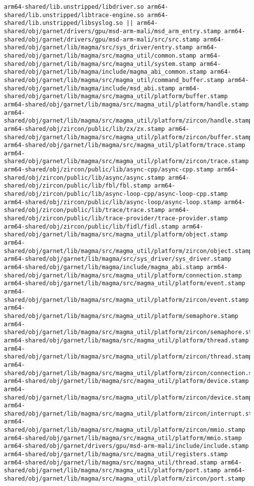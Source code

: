 \begin{verbatim}
arm64-shared/lib.unstripped/libdriver.so arm64-shared/lib.unstripped/libtrace-engine.so arm64-shared/lib.unstripped/libsyslog.so || arm64-shared/obj/garnet/drivers/gpu/msd-arm-mali/msd_arm_entry.stamp arm64-shared/obj/garnet/drivers/gpu/msd-arm-mali/src/src.stamp arm64-shared/obj/garnet/lib/magma/src/sys_driver/entry.stamp arm64-shared/obj/garnet/lib/magma/src/magma_util/common.stamp arm64-shared/obj/garnet/lib/magma/src/magma_util/system.stamp arm64-shared/obj/garnet/lib/magma/include/magma_abi_common.stamp arm64-shared/obj/garnet/lib/magma/src/magma_util/command_buffer.stamp arm64-shared/obj/garnet/lib/magma/include/msd_abi.stamp arm64-shared/obj/garnet/lib/magma/src/magma_util/platform/buffer.stamp arm64-shared/obj/garnet/lib/magma/src/magma_util/platform/handle.stamp arm64-shared/obj/garnet/lib/magma/src/magma_util/platform/zircon/handle.stamp arm64-shared/obj/zircon/public/lib/zx/zx.stamp arm64-shared/obj/garnet/lib/magma/src/magma_util/platform/zircon/buffer.stamp arm64-shared/obj/garnet/lib/magma/src/magma_util/platform/trace.stamp arm64-shared/obj/garnet/lib/magma/src/magma_util/platform/zircon/trace.stamp arm64-shared/obj/zircon/public/lib/async-cpp/async-cpp.stamp arm64-shared/obj/zircon/public/lib/async/async.stamp arm64-shared/obj/zircon/public/lib/fbl/fbl.stamp arm64-shared/obj/zircon/public/lib/async-loop-cpp/async-loop-cpp.stamp arm64-shared/obj/zircon/public/lib/async-loop/async-loop.stamp arm64-shared/obj/zircon/public/lib/trace/trace.stamp arm64-shared/obj/zircon/public/lib/trace-provider/trace-provider.stamp arm64-shared/obj/zircon/public/lib/fidl/fidl.stamp arm64-shared/obj/garnet/lib/magma/src/magma_util/platform/object.stamp arm64-shared/obj/garnet/lib/magma/src/magma_util/platform/zircon/object.stamp arm64-shared/obj/garnet/lib/magma/src/sys_driver/sys_driver.stamp arm64-shared/obj/garnet/lib/magma/include/magma_abi.stamp arm64-shared/obj/garnet/lib/magma/src/magma_util/platform/connection.stamp arm64-shared/obj/garnet/lib/magma/src/magma_util/platform/event.stamp arm64-shared/obj/garnet/lib/magma/src/magma_util/platform/zircon/event.stamp arm64-shared/obj/garnet/lib/magma/src/magma_util/platform/semaphore.stamp arm64-shared/obj/garnet/lib/magma/src/magma_util/platform/zircon/semaphore.stamp arm64-shared/obj/garnet/lib/magma/src/magma_util/platform/thread.stamp arm64-shared/obj/garnet/lib/magma/src/magma_util/platform/zircon/thread.stamp arm64-shared/obj/garnet/lib/magma/src/magma_util/platform/zircon/connection.stamp arm64-shared/obj/garnet/lib/magma/src/magma_util/platform/device.stamp arm64-shared/obj/garnet/lib/magma/src/magma_util/platform/zircon/device.stamp arm64-shared/obj/garnet/lib/magma/src/magma_util/platform/zircon/interrupt.stamp arm64-shared/obj/garnet/lib/magma/src/magma_util/platform/zircon/mmio.stamp arm64-shared/obj/garnet/lib/magma/src/magma_util/platform/mmio.stamp arm64-shared/obj/garnet/drivers/gpu/msd-arm-mali/include/include.stamp arm64-shared/obj/garnet/lib/magma/src/magma_util/registers.stamp arm64-shared/obj/garnet/lib/magma/src/magma_util/thread.stamp arm64-shared/obj/garnet/lib/magma/src/magma_util/platform/port.stamp arm64-shared/obj/garnet/lib/magma/src/magma_util/platform/zircon/port.stamp

\end{verbatim}